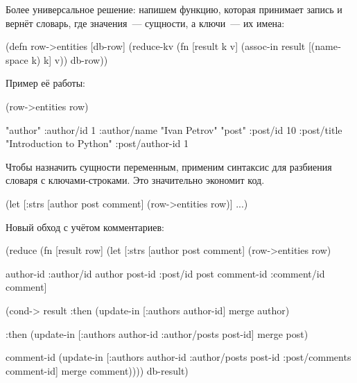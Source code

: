 Более универсальное решение: напишем функцию, которая принимает запись и вернёт словарь, где значения~--- сущности, а ключи~--- их имена:

\pagebreaklarge

\begin{english}
  \begin{clojure}
(defn row->entities
  [db-row]
  (reduce-kv
   (fn [result k v]
     (assoc-in result [(namespace k) k] v))
   {}
   db-row))
  \end{clojure}
\end{english}

Пример её работы:

\begin{english}
  \begin{clojure}
(row->entities row)

{"author"
 {:author/id 1
  :author/name "Ivan Petrov"}
 "post"
 {:post/id 10
  :post/title "Introduction to Python"
  :post/author-id 1}}
  \end{clojure}
\end{english}

Чтобы назначить сущности переменным, применим синтаксис  для разбиения словаря с ключами-строками. Это значительно экономит код.

\begin{english}
  \begin{clojure}
(let [{:strs [author
              post
              comment]}
      (row->entities row)]
  ...)
  \end{clojure}
\end{english}

Новый обход с учётом комментариев:

\begin{english}
  \begin{clojure}
(reduce
 (fn [result row]
   (let [{:strs [author post comment]}
         (row->entities row)

         {author-id :author/id}   author
         {post-id :post/id}       post
         {comment-id :comment/id} comment]

     (cond-> result
       :then
       (update-in [:authors
                   author-id] merge author)

       :then
       (update-in [:authors
                   author-id
                   :author/posts
                   post-id] merge post)

       comment-id
       (update-in [:authors
                   author-id
                   :author/posts
                   post-id
                   :post/comments
                   comment-id] merge comment))))
 {}
 db-result)
  \end{clojure}
\end{english}

